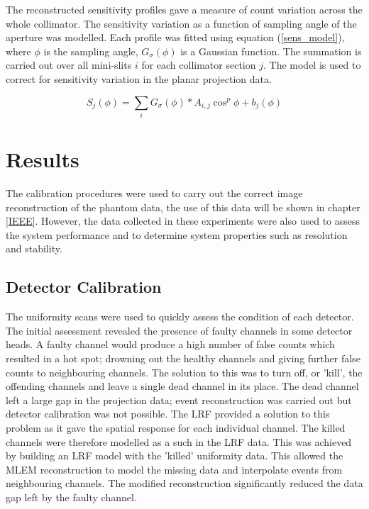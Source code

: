 The reconstructed sensitivity profiles gave a measure of count variation across the whole collimator. The sensitivity variation as a function of sampling angle of the aperture was modelled. Each profile was fitted using equation (\ref{sens_model}), where $\phi$ is the sampling angle, $G_{\sigma}(\phi)$ is a Gaussian function. The summation is carried out over all mini-slits $i$ for each collimator section $j$. The model is used to correct for sensitivity variation in the planar projection data. 

\begin{equation}
\label{sens_model}
S_{j}(\phi) = \sum_{i} G_{\sigma}(\phi) \ast A_{i,j} \cos^{p}{\phi} + b_{j}(\phi)
\end{equation}

\section{Results}
The calibration procedures were used to carry out the correct image reconstruction of the phantom data, the use of this data will be shown in chapter \ref{IEEE}. However, the data collected in these experiments were also used to assess the system performance and to determine system properties such as resolution and stability. 

\subsection{Detector Calibration}
 The uniformity scans were used to quickly assess the condition of each detector. The initial assessment revealed the presence of faulty channels in some detector heads. A faulty channel would produce a high number of false counts which resulted in a hot spot; drowning out the healthy channels and giving further false counts to neighbouring channels. The solution to this was to turn off, or 'kill', the offending channels and leave a single dead channel in its place. The dead channel left a large gap in the projection data; event reconstruction was carried out but detector calibration was not possible. The \acrshort{LRF} provided a solution to this problem as it gave the spatial response for each individual channel. The killed channels were therefore modelled as a such in the \acrshort{LRF} data. This was achieved by building an \acrshort{LRF} model with the 'killed' uniformity data. This allowed the \acrshort{MLEM} reconstruction to model the missing data and interpolate events from neighbouring channels. The modified reconstruction significantly reduced the data gap left by the faulty channel.
 
